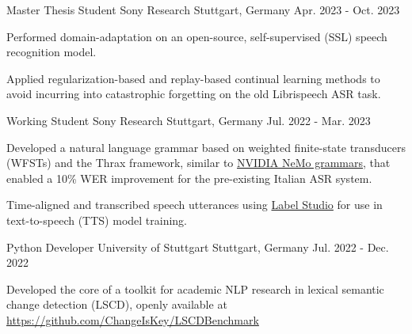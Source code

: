

\begin{cventries}

  \cventry
    {Master Thesis Student} %
    {Sony Research} %
    {Stuttgart, Germany} %
    {Apr. 2023 - Oct. 2023} %
    {
      \begin{cvitems} %
        \item {Performed domain-adaptation on an open-source, self-supervised (SSL) speech recognition model.}
        \item {Applied regularization-based and replay-based continual learning methods to avoid incurring into catastrophic forgetting on the old Librispeech ASR task.}
      \end{cvitems}
    }

  \cventry
    {Working Student} %
    {Sony Research} %
    {Stuttgart, Germany} %
    {Jul. 2022 - Mar. 2023} %
    {
      \begin{cvitems} %
        \item {Developed a natural language grammar based on weighted finite-state transducers (WFSTs) and the Thrax framework, similar to \href{https://github.com/NVIDIA/NeMo-text-processing}{NVIDIA NeMo grammars}, that enabled a 10\% WER improvement for the pre-existing Italian ASR system.}
        \item {Time-aligned and transcribed speech utterances using \href{https://labelstud.io/}{Label Studio} for use in text-to-speech (TTS) model training.}
      \end{cvitems}
    }

  \cventry
    {Python Developer} %
    {University of Stuttgart} %
    {Stuttgart, Germany} %
    {Jul. 2022 - Dec. 2022} %
    {
      \begin{cvitems} %
        \item {Developed the core of a toolkit for academic NLP research in lexical semantic change detection (LSCD), openly
available at \url{https://github.com/ChangeIsKey/LSCDBenchmark}}
      \end{cvitems}
    }


\end{cventries}
